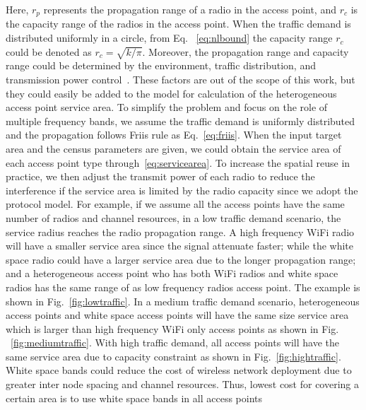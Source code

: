 Here, $r_p$ represents the propagation range of a radio in the access point, and $r_c$ is the capacity range of 
the radios in the access point. When the traffic demand is distributed uniformly in a circle, from Eq.
~\ref{eq:nlbound} the capacity range $r_c$ could be denoted as $r_c=\sqrt{k/\pi}$. Moreover, the propagation 
range and capacity range could be determined by the environment, traffic distribution, and transmission power 
control~\cite{robinson2010deploying}. These factors are out of the scope of this work, but they could easily 
be added to the model for calculation of the heterogeneous access point service area. To simplify the problem 
and focus on the role of multiple frequency bands, we assume the traffic demand is uniformly distributed and 
the propagation follows Friis rule as Eq.~\ref{eq:friis}. When the input target area and the census parameters 
are given, we could obtain the service area of each access point type through~\ref{eq:servicearea}. To increase 
the spatial reuse in practice, we then adjust the transmit power of each radio to reduce the interference if 
the service area is limited by the radio capacity since we adopt the protocol model. 
For example, if we assume all the access points have the same number of radios and channel resources,
in a low traffic demand scenario, the service radius reaches the radio propagation range. A high frequency 
WiFi radio will have a smaller service area since the signal attenuate faster; while the white space radio 
could have a larger service area due to the longer propagation range; and a heterogeneous access point who 
has both WiFi radios and white space radios has the same range of as low frequency radios access point. 
The example is shown in Fig.~\ref{fig:lowtraffic}.
In a medium traffic demand scenario, heterogeneous access points and white space access points will 
have the same size service area which is larger than high frequency WiFi only access points as shown in Fig.
~\ref{fig:mediumtraffic}.
With high traffic demand, all access points will have the same service area due to capacity constraint 
as shown in Fig.~\ref{fig:hightraffic}. White space bands could reduce the cost of wireless network 
deployment due to greater inter node spacing and channel resources. 
Thus, lowest cost for covering a certain area is to use white space bands in all access points 
